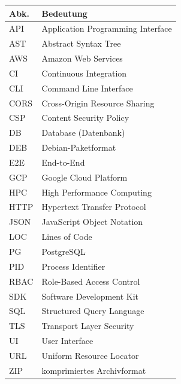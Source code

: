 \documentclass[11pt,a4paper]{article}
\begin{document}
\begin{tabularx}{\textwidth}{@{}lX@{}}
\textbf{Abk.} & \textbf{Bedeutung} \\
\hline

API  & Application Programming Interface \\
AST  & Abstract Syntax Tree \\
AWS  & Amazon Web Services \\
CI   & Continuous Integration \\
CLI  & Command Line Interface \\
CORS & Cross-Origin Resource Sharing \\
CSP  & Content Security Policy \\
DB   & Database (Datenbank) \\
DEB  & Debian-Paketformat \\
E2E  & End-to-End \\
GCP  & Google Cloud Platform \\
HPC  & High Performance Computing \\
HTTP & Hypertext Transfer Protocol \\
JSON & JavaScript Object Notation \\
LOC  & Lines of Code \\
PG   & PostgreSQL \\
PID  & Process Identifier \\
RBAC & Role-Based Access Control \\
SDK  & Software Development Kit \\
SQL  & Structured Query Language \\
TLS  & Transport Layer Security \\
UI   & User Interface \\
URL  & Uniform Resource Locator \\
ZIP  & komprimiertes Archivformat \\

\end{tabularx}

\clearpage
{}
\setcounter{page}{1}










\end{document}
